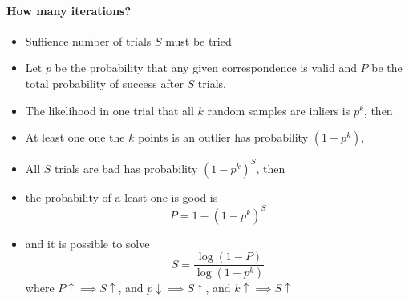 \documentclass[11pt]{article}
\begin{document}
\paragraph{How many iterations?}  
\begin{itemize}
	\item Suffience number of trials $S$ must be tried
	\item Let $p$ be the probability that any given correspondence is valid and $P$ be the total probability of success after $S$ trials. 
	\item The likelihood in one trial that all $k$ random samples are inliers is $p^k$, then
	\item At least one one the $k$ points is an outlier has probability $(1 - p^k)$,
	\item All $S$ trials are bad has probability $(1 - p^k)^S$, then
	\item the probability of a least one is good is
		\begin{equation}
			P = 1 - (1 - p^k)^S
		\end{equation}
	\item and it is possible to solve 
		\begin{equation}
			S = \frac{\log (1 - P)}{\log (1 - p^k)} 
		\end{equation}
		where $P \uparrow \implies S\uparrow$, and $p\downarrow \implies S\uparrow$, and $k \uparrow \implies S\uparrow$
\end{itemize}
\end{document}
